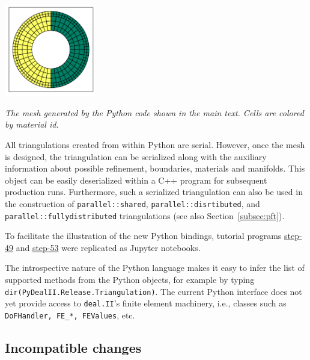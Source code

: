 \documentclass{ansarticle-preprint}
\newcommand{\specialword}[1]{\texttt{#1}}
\newcommand{\dealii}{{\specialword{deal.II}}\xspace}
\begin{document}
\begin{floatingfigure}[r]{0.3\textwidth}
  \centering
  \vspace*{-1.4cm}
  \includegraphics[width=0.3\textwidth]{python_mesh.png}
  \vspace*{-5mm}
  \caption{\it The mesh generated by the Python code shown in the main
    text. Cells are colored by material id.}
  \vspace*{0.2cm}
\label{fig:pymesh}
\end{floatingfigure}
All triangulations created from within Python are serial. However,
once the mesh is designed, the triangulation can be serialized along
with the auxiliary information about possible refinement, boundaries,
materials and manifolds. This object can be easily deserialized within
a C++ program for subsequent production runs. Furthermore, such a
serialized triangulation can also be used in the construction of
\texttt{parallel::shared}, \texttt{parallel::disrtibuted}, and
\texttt{parallel::fullydistributed} triangulations (see also Section~\ref{subsec:pft}).

To facilitate the illustration of the new Python bindings, tutorial programs \href{https://github.com/dealii/dealii/blob/dealii-9.2/examples/step-49/step-49.ipynb}{step-49} and \href{https://github.com/dealii/dealii/blob/dealii-9.2/examples/step-53/step-53.ipynb}{step-53} were replicated as Jupyter notebooks.

The introspective nature of the Python language makes it easy to infer
the list of supported methods from the Python objects, for example by
typing \texttt{dir(PyDealII.Release.Triangulation)}. 
The current Python interface does not yet provide access to \dealii{}'s finite element machinery, i.e., classes such as \texttt{DoFHandler, FE\_*, FEValues}, etc. 

\subsection{Incompatible changes}
\end{document}

